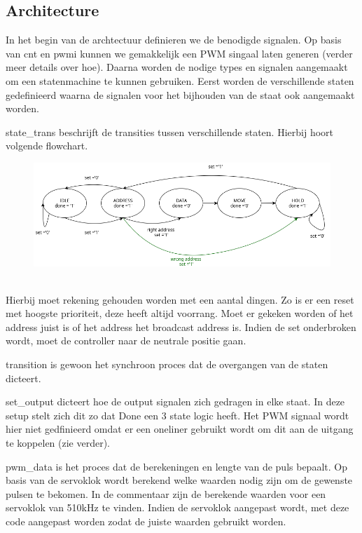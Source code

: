 \subsection{Architecture}
In het begin van de archtectuur definieren we de benodigde signalen. Op basis van cnt en pwmi kunnen we gemakkelijk een PWM singaal laten generen (verder meer details over hoe). Daarna worden de nodige types en signalen aangemaakt om een statenmachine te kunnen gebruiken. Eerst worden de verschillende staten gedefinieerd waarna de signalen voor het bijhouden van de staat ook aangemaakt worden.


state\_trans beschrijft de transities tussen verschillende staten. Hierbij hoort volgende flowchart.
\begin{figure}[h]
	\includegraphics[width=\linewidth]{servocontrol.png}
\end{figure}\\
Hierbij moet rekening gehouden worden met een aantal dingen. Zo is er een reset met hoogste prioriteit, deze heeft altijd voorrang. Moet er gekeken worden of het address juist is of het address het broadcast address is. Indien de set onderbroken wordt, moet de controller naar de neutrale positie gaan.


transition is gewoon het synchroon proces dat de overgangen van de staten dicteert.


set\_output dicteert hoe de output signalen zich gedragen in elke staat. In deze setup stelt zich dit zo dat Done een 3 state logic heeft. Het PWM signaal wordt hier niet gedfinieerd omdat er een oneliner gebruikt wordt om dit aan de uitgang te koppelen (zie verder).


pwm\_data is het proces dat de berekeningen en lengte van de puls bepaalt. Op basis van de servoklok wordt berekend welke waarden nodig zijn om de gewenste pulsen te bekomen. In de commentaar zijn de berekende waarden voor een servoklok van 510kHz te vinden. Indien de servoklok aangepast wordt, met deze code aangepast worden zodat de juiste waarden gebruikt worden.

